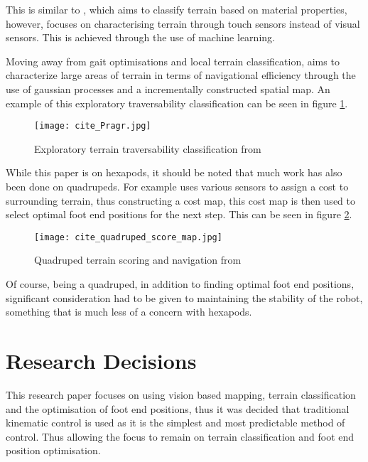     This is similar to \cite{Xu2023Learning}, which aims to
    classify terrain based on material properties, however, \cite{Xu2023Learning} focuses on characterising terrain through touch sensors instead of visual sensors.
    This is achieved through the use of machine learning.
    
    Moving away from gait optimisations and local terrain classification, \cite{Prágr2019Online} aims to characterize
    large areas of terrain in terms of navigational efficiency through the use of gaussian processes and a incrementally constructed spatial map.
    An example of this exploratory traversability classification can be seen in figure \ref{fig:cite_pragr}.
    \begin{figure}[h]
        \centering
        \texttt{[image: cite\_Pragr.jpg]}
        \caption{Exploratory terrain traversability classification from \cite{Prágr2019Online}}
        \label{fig:cite_pragr}
    \end{figure}

    \newpage
    \noindent
    While this paper is on hexapods, it should be noted that much work has also been done on quadrupeds. For example \cite{Mastalli2020Motion} uses various sensors
    to assign a cost to surrounding terrain, thus constructing a cost map, this cost map is then used to select optimal foot end positions for the next step. This can be seen in
    figure \ref{fig:cite_quadruped_walk}.
    \begin{figure}[h]
        \centering
        \texttt{[image: cite\_quadruped\_score\_map.jpg]}
        \caption{Quadruped terrain scoring and navigation from \cite{Mastalli2020Motion}}
        \label{fig:cite_quadruped_walk}
    \end{figure}
    Of course, being a quadruped, in addition to finding optimal foot end positions, significant consideration had to be given to maintaining the stability of the robot,
    something that is much less of a concern with hexapods.

\section{Research Decisions}
    This research paper focuses on using vision based mapping, terrain classification and the optimisation of foot end positions, thus it was decided that
    traditional kinematic control is used as it is the simplest and most predictable method of control. Thus allowing the focus to remain on terrain
    classification and foot end position optimisation.

